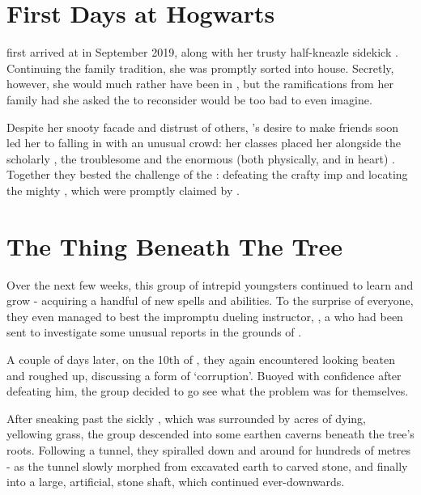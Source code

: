 \documentclass[oneside, 9pt,english]{extbook}
\title{\key{Cerise's Memory}}
\date{September - December, 2020}
\begin{document}
	\maketitle
	
	\section{First Days at Hogwarts}
	 first arrived at  in September 2019, along with her trusty half-kneazle sidekick . Continuing the family tradition, she was promptly sorted into  house. Secretly, however, she would much rather have been in , but the ramifications from her family had she asked the  to reconsider would be too bad to even imagine. 
	
	Despite her snooty facade and distrust of others, 's desire to make friends soon led her to falling in with an unusual crowd: her classes placed her alongside  the scholarly , the troublesome  and the enormous (both physically, and in heart) . Together they bested the challenge of the : defeating the crafty imp  and locating the mighty , which were promptly claimed by .
	
	\section{The Thing Beneath The Tree}
	Over the next few weeks, this group of intrepid youngsters continued to learn and grow - acquiring a handful of new spells and abilities. To the surprise of everyone, they even managed to best the impromptu dueling instructor, , a  who had been sent to investigate some unusual reports in the grounds of . 
	
	A couple of days later, on the 10th of , they again encountered  looking beaten and roughed up, discussing a form of `corruption'. Buoyed with confidence after defeating him, the group decided to go see what the problem was for themselves. 
	
	After sneaking past the sickly , which was surrounded by acres of dying, yellowing grass, the group descended into some earthen caverns beneath the tree's roots. Following a tunnel, they spiralled down and around for hundreds of metres - as the tunnel slowly morphed from excavated earth to carved stone, and finally into a large, artificial, stone shaft, which continued ever-downwards.
	
\end{document}

